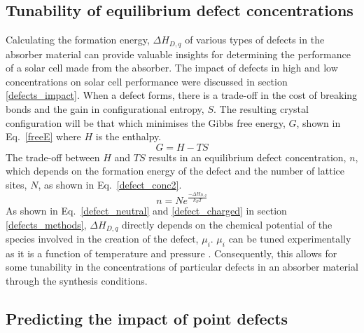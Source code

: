 \documentclass[11pt, twoside]{report}
\begin{document}
\subsection{Tunability of equilibrium defect concentrations}
Calculating the formation energy, $\Delta H_{D,q}$ of various types of defects in the absorber material can provide valuable insights for determining the performance of a solar cell made from the absorber. The impact of defects in high and low concentrations on solar cell performance were discussed in section \ref{defects_impact}. When a defect forms, there is a trade-off in the cost of breaking bonds and the gain in configurational entropy, $S$. The resulting crystal configuration will be that which minimises the Gibbs free energy, $G$, shown in Eq.~\ref{freeE} where $H$ is the enthalpy. 
\begin{equation}\label{freeE}
G = H - TS
\end{equation}
The trade-off between $H$ and $TS$ results in an equilibrium defect concentration, $n$, which depends on the formation energy of the defect and the number of lattice sites, $N$, as shown in Eq.~\ref{defect_conc2}.
\begin{equation}\label{defect_conc2}
n = N e^{\frac{-\Delta H_{D,q}}{k_B T}}
\end{equation}
As shown in Eq.~\ref{defect_neutral} and \ref{defect_charged} in section \ref{defects_methods}, $\Delta H_{D,q}$ directly depends on the chemical potential of the species involved in the creation of the defect, $\mu_i$. $\mu_i$ can be tuned experimentally as it is a function of temperature and pressure \cite{Adam_sulfur}. Consequently, this allows for some tunability in the concentrations of particular defects in an absorber material through the synthesis conditions.

\subsection{Predicting the impact of point defects}
\end{document}
